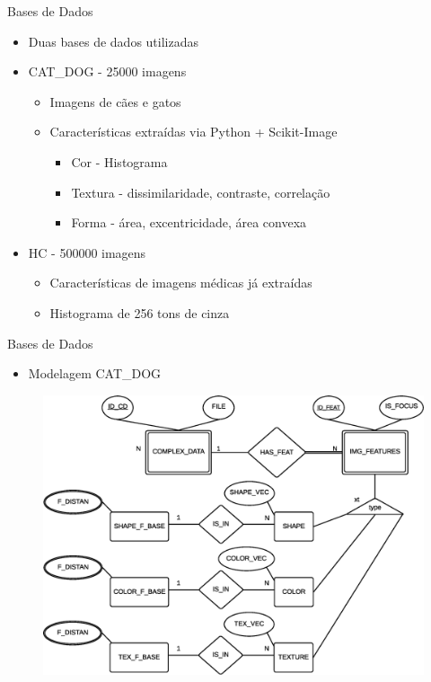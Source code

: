 \documentclass{beamer}
\begin{document}
\begin{frame}{Bases de Dados}
  \begin{itemize}
   \item Duas bases de dados utilizadas\newline
  \item CAT\_DOG - 25000 imagens
      \begin{itemize}
       \item Imagens de cães e gatos
       \item Características extraídas via Python + Scikit-Image
	  \begin{itemize}
	    \item Cor - Histograma
	    \item Textura - dissimilaridade, contraste, correlação
	    \item Forma - área, excentricidade, área convexa\newline
	  \end{itemize}
      \end{itemize}

  \item HC - 500000 imagens
      \begin{itemize}
	\item Características de imagens médicas já extraídas
	\item Histograma de 256 tons de cinza
      \end{itemize}
      
  \end{itemize}

\end{frame}

\begin{frame}{Bases de Dados}
  \begin{itemize}
   \item Modelagem CAT\_DOG
  \end{itemize}
  \begin{figure}[H]
      \centering
      \includegraphics[width=.7\textwidth]{dados/figuras/mer_cd.eps}
  \end{figure}
\end{frame}
\end{document}
